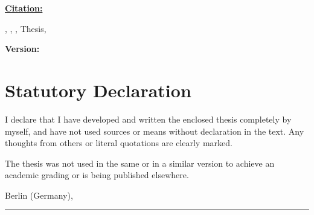 \begin{titlepage}
    \textbf{\underline{Citation:}}\par
    \textbf{\theauthor},
    \textit{\thetitle}, \university,
    \thesisKind{} Thesis, \Year\par
    \vspace{2.5\baselineskip}

    \textbf{Version:} \versionnumber
    \vfill
\end{titlepage}


\chapter*{Statutory Declaration}
\thispagestyle{empty} %
\setcounter{page}{1}

I declare that I have developed and written the enclosed \thesisKind{} thesis completely by myself, and have not used sources or means without declaration in the text. Any thoughts from others or literal quotations are clearly marked.\par
The \thesisKind{} thesis was not used in the same or in a similar version to achieve an academic grading or is being published elsewhere.\vspace{2\baselineskip}

Berlin (Germany), \thedate\vspace{2.5\baselineskip}

\rule{15.5em}{1pt}\newline
\theauthor